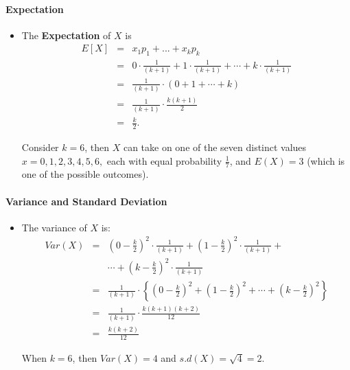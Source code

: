 \documentclass[smaller]{beamer}\usepackage[]{graphicx}\usepackage[]{color}
\newenvironment{stepitemize}{\begin{itemize}[<+->]}{\end{itemize} }
\begin{document}
\begin{frame}{\secname}
\framesubtitle{Expectation}
  \begin{stepitemize}
  \item The \textbf{Expectation} of $X$ is
  \begin{eqnarray*}
  E\left[ X\right] &=&  x_1 p_1 + ... +  x_k p_k\\
  &=& 0\cdot \frac{1}{\left( k+1\right) }+1\cdot \frac{1}{
  \left( k+1\right) }+\cdots +k\cdot \frac{1}{\left( k+1\right) } \\
  &=&\frac{1}{\left( k+1\right) }\cdot\left( 0+1+\cdots +k\right) \\
  &=&\frac{1}{\left( k+1\right) }\cdot \frac{k\left( k+1\right) }{2} \\
  &=&\frac{k}{2}.
  \end{eqnarray*}

  \begin{example}
  \begin{footnotesize}
  Consider $k=6$, then $X$ can take on one of the seven distinct values
  $x=0,1,2,3,4,5,6,$ each with equal probability $\frac{1}{7}$, and $E(X)=3$ (which is one of the possible outcomes).
  \end{footnotesize}
  \end{example}
  \end{stepitemize}
\end{frame}

\begin{frame}{\secname}
\framesubtitle{Variance and Standard Deviation}
  \begin{stepitemize}
  \item The variance of $X$ is:
  \begin{eqnarray*}
  Var\left( X\right) &=&\left( 0-\frac{k}{2}\right) ^{2}\cdot \frac{1}{\left(
  k+1\right) }+\left( 1-\frac{k}{2}\right) ^{2}\cdot \frac{1}{\left(
  k+1\right) }+ \\
  &&\cdots +\left( k-\frac{k}{2}\right) ^{2}\cdot \frac{1}{\left( k+1\right) }
  \\
  &=&\frac{1}{\left( k+1\right) }\cdot\left\{ \left( 0-\frac{k}{2}\right)
  ^{2}+\left( 1-\frac{k}{2}\right) ^{2}+\cdots +\left( k-\frac{k}{2}\right)
  ^{2}\right\} \\
  &=&\frac{1}{\left( k+1\right) }\cdot \frac{k\left( k+1\right) \left(
  k+2\right) }{12} \\
  &=&\frac{k\left( k+2\right) }{12}
  \end{eqnarray*}

  \begin{example}
  \begin{footnotesize}
  When $k=6$, then  $Var(X) = 4$ and $s.d(X)= \sqrt{4}=2$.
  \end{footnotesize}
  \end{example}
  \end{stepitemize}
\end{frame}
\end{document}
